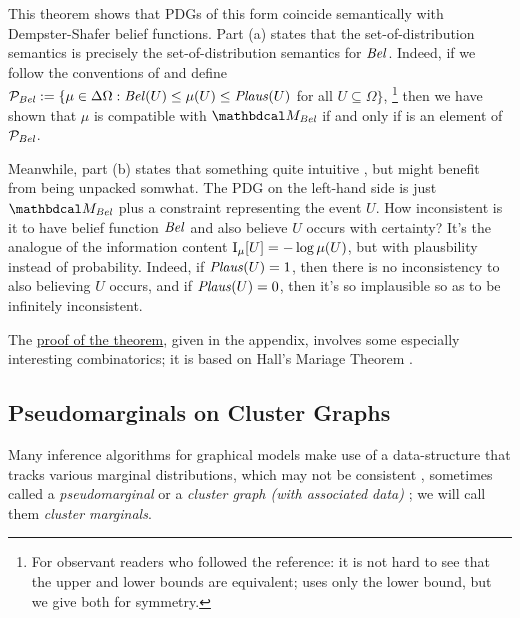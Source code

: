 This theorem shows that PDGs of this form coincide semantically with Dempster-Shafer belief functions. 
Part (a) states that the set-of-distribution semantics is precisely the set-of-distribution semantics for $\mathit{Bel}$.
Indeed, if we follow the conventions of \citet[Theorem 2.6.1]{halpern-RAU} and define $\mathcal P_{\mathit{Bel}} := \{ \mu \in \Delta \Omega : \mathit{Bel}(U) \le \mu(U) \le \mathit{Plaus}(U)$ for all $U \subseteq \Omega \}$, 
\unskip\footnote{For observant readers who followed the reference: it is not hard to see that the upper and lower bounds are equivalent; \citet{halpern-RAU} uses only the lower bound, but we give both for symmetry.}
then we have shown that $\mu$ is compatible with $\dg M_{\Bel}$ if and only if is an element of $\mathcal P_{\mathit{Bel}}$. 

Meanwhile, part (b) states that something quite intuitive
%
\unskip, but might benefit from being unpacked somwhat.  The PDG on the left-hand side is just $\dg M_{\Bel}$ plus a constraint representing the event $U$. 
How inconsistent is it to have belief function $\mathit{Bel}$ and also believe $U$ occurs with certainty? 
It's the analogue of the information content $\operatorname{\mathrm{I}}_\mu[U] = - \log \mu(U)$, but with plausbility instead of probability. 
Indeed, if $\mathit{Plaus}(U) = 1$, then there is no inconsistency to also believing $U$ occurs, and if $\mathit{Plaus}(U) = 0$, then it's so implausible so as to be infinitely inconsistent. 

The \hyperref[proof:belplaus-pdg]{proof of the theorem}, given in the appendix, involves some especially interesting combinatorics; it is based on Hall's Mariage Theorem \citep{Hall1935}.



\subsection{Pseudomarginals on Cluster Graphs}
    \label{ssec:pseudomarginal-cluster-graph}

Many inference algorithms for graphical models make use of a data-structure that tracks various marginal distributions, which may not be consistent \citep{wainwright2003tree,wainwright2008graphical,KF09},
sometimes called a \emph{pseudomarginal} \citep{wainwright2008graphical} or a \emph{cluster graph (with associated data)} \citep{KF09}; we will call them \emph{cluster marginals}.

